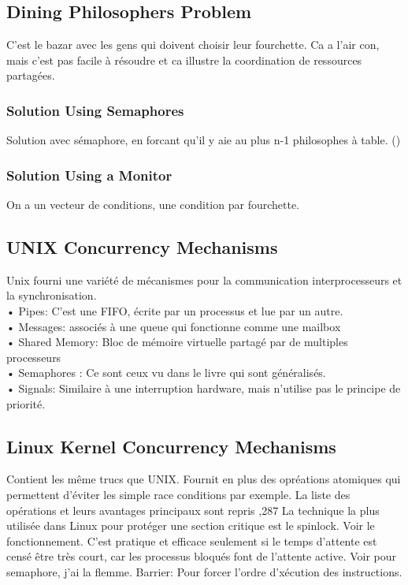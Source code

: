 \subsection{Dining Philosophers Problem}
C'est le bazar avec les gens qui doivent choisir leur fourchette. Ca a l'air con, mais c'est pas facile à résoudre et ca illustre la coordination de ressources partagées.
\subsubsection{Solution Using Semaphores}
Solution avec sémaphore, en forcant qu'il y aie au plus n-1 philosophes à table. (\cite[p.~281]{stallings})
\subsubsection{Solution Using a Monitor}
On a un vecteur de conditions, une condition par fourchette. \cite[p.~282]{stallings}
\subsection{UNIX Concurrency Mechanisms}
Unix fourni une variété de mécanismes pour la communication interprocesseurs et la synchronisation.\\
• Pipes: C'est une FIFO, écrite par un processus et lue par un autre.\\
• Messages: associés à une queue qui fonctionne comme une mailbox\\
• Shared Memory: Bloc de mémoire virtuelle partagé par de multiples processeurs\\
• Semaphores : Ce sont ceux vu dans le livre qui sont généralisés.\\
• Signals: Similaire à une interruption hardware, mais n'utilise pas le principe de priorité.
\subsection{Linux Kernel Concurrency Mechanisms}
Contient les même trucs que UNIX.
Fournit en plus des opréations atomiques qui permettent d'éviter les simple race conditions par exemple. La liste des opérations et leurs avantages principaux sont repris \cite[p.~286]{stallings},287
La technique la plus utilisée dans Linux pour protéger une section critique est le spinlock. Voir le fonctionnement. C'est pratique et efficace seulement si le temps d'attente est censé être très court, car les processus bloqués font de l'attente active.
Voir pour semaphore, j'ai la flemme.
Barrier: Pour forcer l'ordre d'xécution des instructions.
